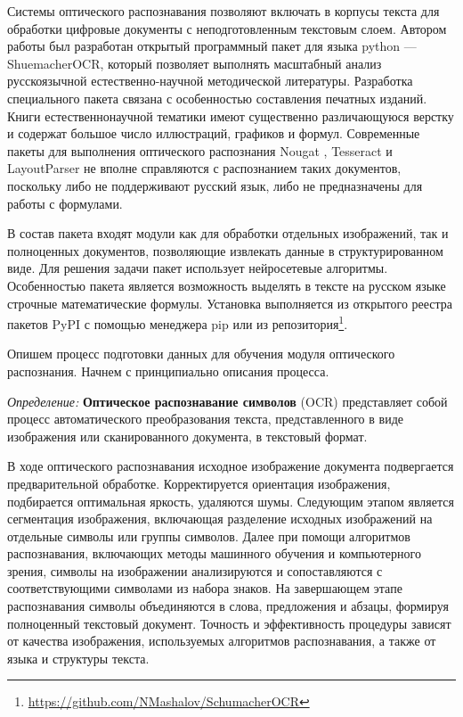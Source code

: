 Системы оптического распознавания позволяют включать в корпусы текста для обработки цифровые документы с неподготовленным текстовым слоем. 
Автором работы был разработан открытый программный пакет для языка python --- ShuemacherOCR, который позволяет выполнять
масштабный анализ русскоязычной естественно-научной методической литературы. Разработка специального пакета связана с особенностью составления печатных изданий.
Книги естественнонаучной тематики имеют существенно различающуюся верстку и содержат большое число иллюстраций, графиков и формул. Современные пакеты
для выполнения оптического распознания Nougat \cite{blecher2023nougat}, Tesseract \cite{smith2007overview} и LayoutParser  \cite{shen2021layoutparser} не вполне справляются
с распознанием таких документов, поскольку либо не поддерживают русский язык, либо не предназначены для работы с формулами.

В состав пакета входят модули как для обработки отдельных изображений, 
так и полноценных документов, позволяющие извлекать данные в структурированном виде. Для решения задачи пакет использует нейросетевые алгоритмы. 
Особенностью пакета  является возможность выделять в тексте на русском языке строчные математические формулы.
Установка выполняется из открытого реестра пакетов PyPI с помощью менеджера pip или из репозитория\footnote{\url{https://github.com/NMashalov/SchumacherOCR}}. 

Опишем процесс подготовки данных для обучения модуля оптического распознания. Начнем с принципиально описания процесса. 

\textit{Определение:} \textbf{Оптическое распознавание символов} (OCR) представляет собой процесс автоматического преобразования текста,
 представленного в виде изображения или сканированного документа, в текстовый формат.
 
В ходе оптического распознавания исходное изображение документа подвергается предварительной обработке. 
Корректируется ориентация изображения, подбирается оптимальная яркость, удаляются шумы. 
Следующим этапом является сегментация изображения, включающая разделение исходных изображений на отдельные символы или группы символов.
Далее при помощи алгоритмов распознавания, включающих методы машинного обучения и компьютерного зрения, 
символы на изображении анализируются и сопоставляются с соответствующими символами из набора знаков. 
На завершающем этапе распознавания символы объединяются в слова, предложения и абзацы, формируя полноценный текстовый документ. 
Точность и эффективность процедуры зависят от качества изображения, используемых алгоритмов распознавания, а также от языка и структуры текста.

